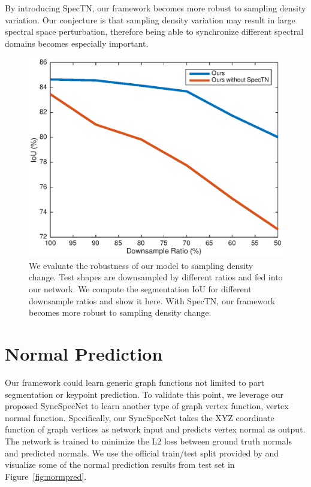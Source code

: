 By introducing SpecTN, our framework becomes more robust to sampling density variation. Our conjecture is that sampling density variation may result in large spectral space perturbation, therefore being able to synchronize different spectral domains becomes especially important.

\begin{figure}
 \centering
 \includegraphics[width=0.75\linewidth]{./fig/downsample.eps}
 \caption{We evaluate the robustness of our model to sampling density change. Test shapes are downsampled by different ratios and fed into our network. We compute the segmentation IoU for different downsample ratios and show it here. With SpecTN, our framework becomes more robust to sampling density change.}
 \label{fig:downsample}
\end{figure}

\section{Normal Prediction}
\label{sec:normal}
Our framework could learn generic graph functions not limited to part segmentation or keypoint prediction. To validate this point, we leverage our proposed SyncSpecNet to learn another type of graph vertex function, vertex normal function. Specifically, our SyncSpecNet takes the XYZ coordinate function of graph vertices as network input and predicts vertex normal as output. The network is trained to minimize the L2 loss between ground truth normals and predicted normals. We use the official train/test split provided by \cite{shapenet2015} and visualize some of the normal prediction results from test set in Figure~\ref{fig:normpred}.


